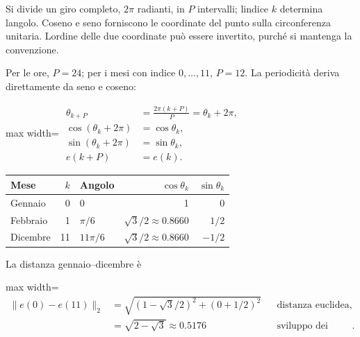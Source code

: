 \documentclass[11pt,a4paper,oneside,openany]{book}
\begin{document}
Si divide un giro completo, \(2\pi\) radianti, in \(P\) intervalli; l\textquotesingle indice \(k\) determina l\textquotesingle angolo. Coseno e seno forniscono le coordinate del punto sulla circonferenza unitaria. L\textquotesingle ordine delle due coordinate può essere invertito, purché si mantenga la convenzione.

Per le ore, \(P=24\); per i mesi con indice \(0,\ldots,11\), \(P=12\). La periodicità deriva direttamente da seno e coseno:

\begin{center}
\begin{adjustbox}{max width=\linewidth}
$\displaystyle 
\begin{aligned}
\theta_{k+P}&=\frac{2\pi(k+P)}P=\theta_k+2\pi,\\
\cos(\theta_k+2\pi)&=\cos\theta_k,\\
\sin(\theta_k+2\pi)&=\sin\theta_k,\\
e(k+P)&=e(k).
\end{aligned}
$
\end{adjustbox}
\end{center}

\begin{longtable}[]{@{}lrlrr@{}}
\toprule\noalign{}
Mese & \(k\) & Angolo & \(\cos\theta_k\) & \(\sin\theta_k\) \\
\midrule\noalign{}
\endhead
\bottomrule\noalign{}
\endlastfoot
Gennaio & 0 & \(0\) & 1 & 0 \\
Febbraio & 1 & \(\pi/6\) & \(\sqrt3/2\approx0.8660\) & \(1/2\) \\
Dicembre & 11 & \(11\pi/6\) & \(\sqrt3/2\approx0.8660\) & \(-1/2\) \\
\end{longtable}

La distanza gennaio--dicembre è

\begin{center}
\begin{adjustbox}{max width=\linewidth}
$\displaystyle 
\begin{aligned}
\|e(0)-e(11)\|_2
&=\sqrt{(1-\sqrt3/2)^2+(0+1/2)^2} &&\text{distanza euclidea},\\
&=\sqrt{2-\sqrt3}\approx0.5176 &&\text{sviluppo dei quadrati}.
\end{aligned}
$
\end{adjustbox}
\end{center}
\end{document}
